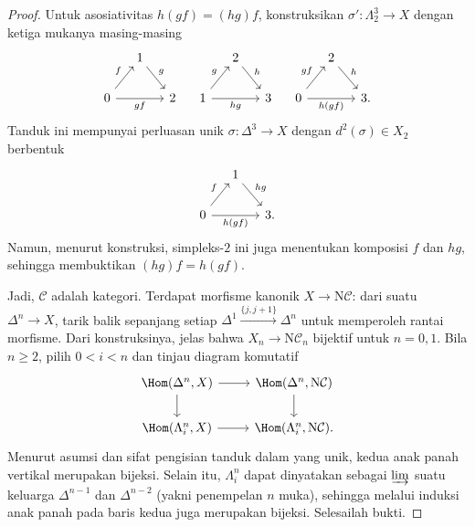 \begin{proof}
	Untuk asosiativitas $h(gf)=(hg)f$, konstruksikan
	$\sigma':\Lambda^3_2\to X$ dengan ketiga mukanya masing-masing
	\[\begin{tikzcd}[column sep=small]
		& 1 \arrow[rd, "g"] & \\
		0 \arrow[ru, "f"] \arrow[rr, "gf"'] & & 2
	\end{tikzcd} \quad \begin{tikzcd}[column sep=small]
		& 2 \arrow[rd, "h"] & \\
		1 \arrow[ru, "g"] \arrow[rr, "hg"'] & & 3
	\end{tikzcd} \quad \begin{tikzcd}[column sep=small]
		& 2 \arrow[rd, "h"] & \\
		0 \arrow[ru, "gf"] \arrow[rr, "h(gf)"'] & & 3.
	\end{tikzcd}\]
	Tanduk ini mempunyai perluasan unik $\sigma:\Delta^3\to X$ dengan
	$d^2(\sigma)\in X_2$ berbentuk
	\[\begin{tikzcd}[column sep=small]
		& 1 \arrow[rd, "hg"] & \\
		0 \arrow[ru, "f"] \arrow[rr, "h(gf)"'] & & 3.
	\end{tikzcd} \]
	Namun, menurut konstruksi, simpleks-$2$ ini juga menentukan komposisi $f$
	dan $hg$, sehingga membuktikan $(hg)f=h(gf)$.

	Jadi, $\mathcal{C}$ adalah kategori. Terdapat morfisme kanonik
	$X\to\mathrm{N}\mathcal{C}$: dari suatu $\Delta^n\to X$, tarik balik
	sepanjang setiap $\Delta^1\xrightarrow{\{j,j+1\}}\Delta^n$ untuk
	memperoleh rantai morfisme. Dari konstruksinya, jelas bahwa
	$X_n\to\mathrm{N}\mathcal{C}_n$ bijektif untuk $n=0,1$. Bila $n\geq2$,
	pilih $0<i<n$ dan tinjau diagram komutatif
	\[\begin{tikzcd}
		\Hom(\Delta^n, X) \arrow[d] \arrow[r] & \Hom(\Delta^n, \mathrm{N}\mathcal{C}) \arrow[d] \\
		\Hom(\Lambda^n_i, X) \arrow[r] & \Hom(\Lambda^n_i, \mathrm{N}\mathcal{C}).
	\end{tikzcd}\]
	Menurut asumsi dan sifat pengisian tanduk dalam yang unik, kedua anak panah
	vertikal merupakan bijeksi. Selain itu, $\Lambda^n_i$ dapat dinyatakan sebagai
	$\varinjlim$ suatu keluarga $\Delta^{n-1}$ dan $\Delta^{n-2}$ (yakni
	penempelan $n$ muka), sehingga melalui induksi anak panah pada baris kedua
	juga merupakan bijeksi. Selesailah bukti.
\end{proof}

